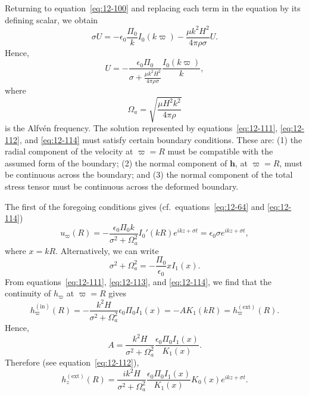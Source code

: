 Returning to equation~\eqref{eq:12-100} and replacing each term in the equation by its defining scalar, we obtain
\begin{equation}
\label{eq:12-113}
\sigma U = -\epsilon_0 \frac{\Pi_0}{k} I_0(k\varpi) - \frac{\mu k^2 H^2}{4\pi\rho\sigma}U.
\end{equation}
Hence,
\begin{equation}
\label{eq:12-114}
U = -\frac{\epsilon_0 \Pi_0}{\sigma + \frac{\mu k^2 H^2}{4\pi\rho\sigma}} \frac{I_0(k\varpi)}{k},
\end{equation}
where
\begin{equation}
\label{eq:12-115}
\Omega_a = \sqrt{\frac{\mu H^2 k^2}{4\pi\rho}}
\end{equation}
is the Alfv\'en frequency. The solution represented by equations~\eqref{eq:12-111}, \eqref{eq:12-112}, and \eqref{eq:12-114} must satisfy certain boundary conditions. These are: (1) the radial component of the velocity at $\varpi = R$ must be compatible with the assumed form of the boundary; (2) the normal component of $\mathbf{h}$, at $\varpi = R$, must be continuous across the boundary; and (3) the normal component of the total stress tensor must be continuous across the deformed boundary.

The first of the foregoing conditions gives (cf.\ equations~\eqref{eq:12-64} and \eqref{eq:12-114})
\begin{equation}
\label{eq:12-116}
u_\varpi(R) = -\frac{\epsilon_0 \Pi_0 k}{\sigma^2+\Omega_a^2}I_0'(kR)e^{ikz+\sigma t} = \epsilon_0\sigma e^{ikz+\sigma t},
\end{equation}
where $x = kR$. Alternatively, we can write
\begin{equation}
\label{eq:12-117}
\sigma^2 + \Omega_a^2 = -\frac{\Pi_0}{\epsilon_0}xI_1(x).
\end{equation}
From equations~\eqref{eq:12-111}, \eqref{eq:12-113}, and \eqref{eq:12-114}, we find that the continuity of $h_\varpi$ at $\varpi = R$ gives
\begin{equation}
\label{eq:12-118}
h_\varpi^{(\mathrm{in})}(R) = -\frac{k^2 H}{\sigma^2+\Omega_a^2}\epsilon_0\Pi_0 I_1(x) = -AK_1(kR) = h_\varpi^{(\mathrm{ext})}(R).
\end{equation}
Hence,
\begin{equation}
\label{eq:12-119}
A = \frac{k^2 H}{\sigma^2+\Omega_a^2}\frac{\epsilon_0\Pi_0 I_1(x)}{K_1(x)}.
\end{equation}
Therefore (see equation~\eqref{eq:12-112}),
\begin{equation}
\label{eq:12-120}
h_z^{(\mathrm{ext})}(R) = \frac{ik^2 H}{\sigma^2+\Omega_a^2}\frac{\epsilon_0\Pi_0 I_1(x)}{K_1(x)}K_0(x)e^{ikz+\sigma t}.
\end{equation}

